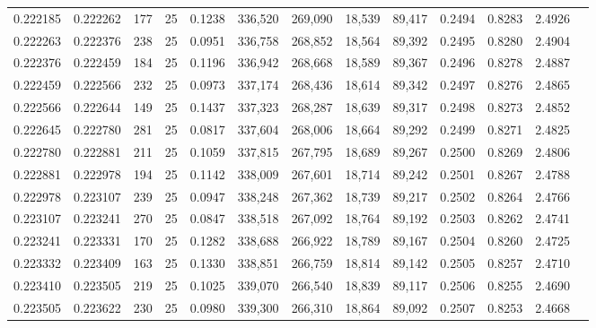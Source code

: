 \begin{tabular}{rrrrrrrrrrrrr}
0.222185 & 0.222262 &   177 &  25 &                                     0.1238 & 336,520 & 269,090 &  18,539 &  89,417 & 0.2494 & 0.8283 & 2.4926 \\
0.222263 & 0.222376 &   238 &  25 &                                     0.0951 & 336,758 & 268,852 &  18,564 &  89,392 & 0.2495 & 0.8280 & 2.4904 \\
0.222376 & 0.222459 &   184 &  25 &                                     0.1196 & 336,942 & 268,668 &  18,589 &  89,367 & 0.2496 & 0.8278 & 2.4887 \\
0.222459 & 0.222566 &   232 &  25 &                                     0.0973 & 337,174 & 268,436 &  18,614 &  89,342 & 0.2497 & 0.8276 & 2.4865 \\
0.222566 & 0.222644 &   149 &  25 &                                     0.1437 & 337,323 & 268,287 &  18,639 &  89,317 & 0.2498 & 0.8273 & 2.4852 \\
0.222645 & 0.222780 &   281 &  25 &                                     0.0817 & 337,604 & 268,006 &  18,664 &  89,292 & 0.2499 & 0.8271 & 2.4825 \\
0.222780 & 0.222881 &   211 &  25 &                                     0.1059 & 337,815 & 267,795 &  18,689 &  89,267 & 0.2500 & 0.8269 & 2.4806 \\
0.222881 & 0.222978 &   194 &  25 &                                     0.1142 & 338,009 & 267,601 &  18,714 &  89,242 & 0.2501 & 0.8267 & 2.4788 \\
0.222978 & 0.223107 &   239 &  25 &                                     0.0947 & 338,248 & 267,362 &  18,739 &  89,217 & 0.2502 & 0.8264 & 2.4766 \\
0.223107 & 0.223241 &   270 &  25 &                                     0.0847 & 338,518 & 267,092 &  18,764 &  89,192 & 0.2503 & 0.8262 & 2.4741 \\
0.223241 & 0.223331 &   170 &  25 &                                     0.1282 & 338,688 & 266,922 &  18,789 &  89,167 & 0.2504 & 0.8260 & 2.4725 \\
0.223332 & 0.223409 &   163 &  25 &                                     0.1330 & 338,851 & 266,759 &  18,814 &  89,142 & 0.2505 & 0.8257 & 2.4710 \\
0.223410 & 0.223505 &   219 &  25 &                                     0.1025 & 339,070 & 266,540 &  18,839 &  89,117 & 0.2506 & 0.8255 & 2.4690 \\
0.223505 & 0.223622 &   230 &  25 &                                     0.0980 & 339,300 & 266,310 &  18,864 &  89,092 & 0.2507 & 0.8253 & 2.4668 \\

\end{tabular}
